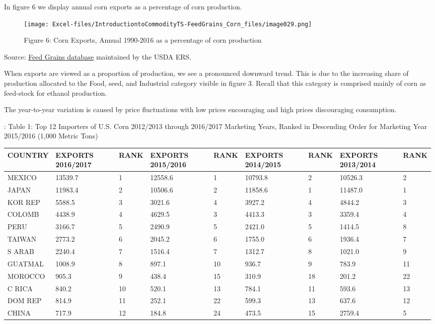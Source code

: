 \documentclass[
]{book}
\begin{document}
In figure 6 we display annual corn exports as a percentage of corn production.

\begin{figure}
\centering
\texttt{[image: Excel-files/IntroductiontoCommodityTS-FeedGrains\_Corn\_files/image029.png]}
\caption{Figure 6: Corn Exports, Annual 1990-2016 as a percentage of corn production}
\end{figure}

Source: \href{http://www.ers.usda.gov/data-products/feed-grains-database/feed-grains-yearbook-tables.aspx\#26780}{Feed Grains database} maintained by the USDA ERS.

When exports are viewed as a proportion of production, we see a pronounced downward trend. This is due to the increasing share of production allocated to the Food, seed, and Industrial category visible in figure 3. Recall that this category is comprised mainly of corn as feed-stock for ethanol production.

The year-to-year variation is caused by price fluctuations with low prices encouraging and high prices discouraging consumption.

: Table 1: Top 12 Importers of U.S. Corn 2012/2013 through 2016/2017 Marketing Years, Ranked in Descending Order for Marketing Year 2015/2016 (1,000 Metric Tons)

\begin{tabular}{l|l|l|l|l|l|l|l|l}
\hline
COUNTRY & EXPORTS 2016/2017 & RANK & EXPORTS 2015/2016 & RANK & EXPORTS 2014/2015 & RANK & EXPORTS 2013/2014 & RANK\\
\hline
MEXICO & 13539.7 & 1 & 12558.6 & 1 & 10793.8 & 2 & 10526.3 & 2\\
\hline
JAPAN & 11983.4 & 2 & 10506.6 & 2 & 11858.6 & 1 & 11487.0 & 1\\
\hline
KOR REP & 5588.5 & 3 & 3021.6 & 4 & 3927.2 & 4 & 4844.2 & 3\\
\hline
COLOMB & 4438.9 & 4 & 4629.5 & 3 & 4413.3 & 3 & 3359.4 & 4\\
\hline
PERU & 3166.7 & 5 & 2490.9 & 5 & 2421.0 & 5 & 1414.5 & 8\\
\hline
TAIWAN & 2773.2 & 6 & 2045.2 & 6 & 1755.0 & 6 & 1936.4 & 7\\
\hline
S ARAB & 2240.4 & 7 & 1516.4 & 7 & 1312.7 & 8 & 1021.0 & 9\\
\hline
GUATMAL & 1008.9 & 8 & 897.1 & 10 & 936.7 & 9 & 783.9 & 11\\
\hline
MOROCCO & 905.3 & 9 & 438.4 & 15 & 310.9 & 18 & 201.2 & 22\\
\hline
C RICA & 840.2 & 10 & 520.1 & 13 & 784.1 & 11 & 593.6 & 13\\
\hline
DOM REP & 814.9 & 11 & 252.1 & 22 & 599.3 & 13 & 637.6 & 12\\
\hline
CHINA & 717.9 & 12 & 184.8 & 24 & 473.5 & 15 & 2759.4 & 5\\
\hline
\end{tabular}
\end{document}
